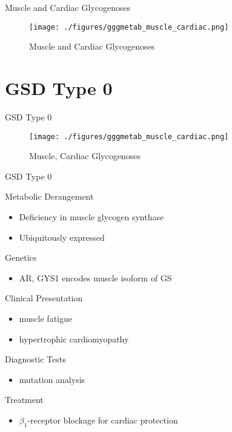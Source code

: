 \documentclass[presentation, smaller]{beamer}
\begin{document}
\begin{frame}[label={sec:orgdc277dd}]{Muscle and Cardiac Glycogenoses}
\begin{figure}[htbp]
\centering
\texttt{[image: ./figures/gggmetab\_muscle\_cardiac.png]}
\caption[Muscle and Cardiac Glycogenoses]{\label{fig:org9da5d60}
Muscle and Cardiac Glycogenoses}
\end{figure}
\end{frame}

\section{GSD Type 0}
\label{sec:orgb13b54e}
\begin{frame}[label={sec:orga488008}]{GSD Type 0}
\begin{figure}[htbp]
\centering
\texttt{[image: ./figures/gggmetab\_muscle\_cardiac.png]}
\caption[Muscle, Cardiac Glycogenoses]{\label{fig:orgb7daf56}
Muscle, Cardiac Glycogenoses}
\end{figure}
\end{frame}


\begin{frame}[label={sec:orgf12ad5c}]{GSD Type 0}
\begin{block}{Metabolic Derangement}
\begin{itemize}
\item Deficiency in muscle glycogen synthase
\item Ubiquitously expressed
\end{itemize}
\end{block}

\begin{block}{Genetics}
\begin{itemize}
\item AR, GYS1 encodes muscle isoform of GS
\end{itemize}
\end{block}

\begin{block}{Clinical Presentation}
\begin{itemize}
\item muscle fatigue
\item hypertrophic cardiomyopathy
\end{itemize}
\end{block}

\begin{block}{Diagnostic Tests}
\begin{itemize}
\item mutation analysis
\end{itemize}
\end{block}
\begin{block}{Treatment}
\begin{itemize}
\item \(\beta_{\text{1}}\)-receptor blockage for cardiac protection
\end{itemize}
\end{block}
\end{frame}
\end{document}
